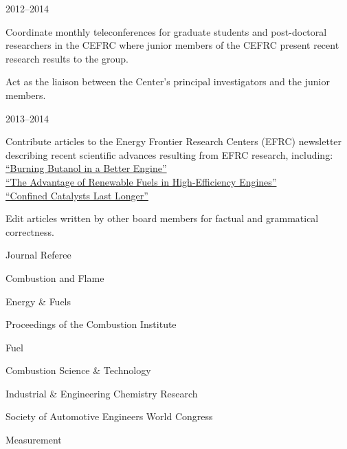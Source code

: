 \begin{lonelist}
\item[]  \hfill 2012--2014\\

\begin{innerlist}
\item Coordinate monthly teleconferences for graduate students
and post-doctoral researchers in the CEFRC where junior members of
the CEFRC present recent research results to the group.
\item Act as the liaison between the Center's principal investigators
and the junior members.
\end{innerlist}

\item[]  \hfill 2013--2014\\

\begin{innerlist}
\item Contribute articles to the Energy Frontier Research Centers (EFRC)
newsletter describing recent scientific advances resulting from
EFRC research, including:\\
\hspace*{0.25in}\href{http://www.energyfrontier.us/newsletter/201210/burning-butanol-better-engine}
{``Burning Butanol in a Better Engine''}\\
\hspace*{0.25in}\href{http://www.energyfrontier.us/newsletter/201401/advantage-renewable-fuels-high-efficiency-engines}
{``The Advantage of Renewable Fuels in High-Efficiency Engines''}\\
\hspace*{0.25in}\href{http://www.energyfrontier.us/newsletter/201404/confined-catalysts-last-longer}
{``Confined Catalysts Last Longer''}
\item Edit articles written by other board members for factual and grammatical correctness.
\end{innerlist}

\item[] Journal Referee
   \begin{innerlist}
       \item Combustion and Flame
       \item Energy \& Fuels
       \item Proceedings of the Combustion Institute
       \item Fuel
       \item Combustion Science \& Technology
       \item Industrial \& Engineering Chemistry Research
       \item Society of Automotive Engineers World Congress
       \item Measurement
   \end{innerlist}

\end{lonelist}

